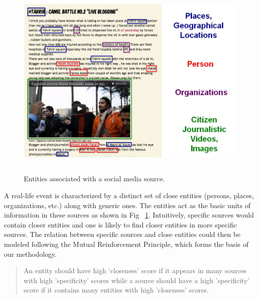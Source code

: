 \begin{figure}[htb]
\includegraphics[height=3.8in,width=4.8in]{Figures/Chapter3Figures/entitySources.jpg} 
\caption{\small Entities associated with a social media source.} 
\label{fg:sourceEntities}
\end{figure}


A real-life event is characterized by a distinct set of close entities (persons, places, organizations, etc.) along with generic ones. The entities act as the basic units of information in these sources as shown in Fig ~\ref{fg:sourceEntities}. Intuitively, specific sources would contain closer entities and one is likely to find closer entities in more specific sources. The relation between specific sources and close entities could then be modeled following the Mutual Reinforcement Principle, which forms the basis of our methodology.


\begin{quote}
An entity should have high `closeness' score if it appears in many sources with high 'specificity' scores while a source should have a high 'specificity' score if it contains many entities with high 'closeness' scores.
\end{quote}

